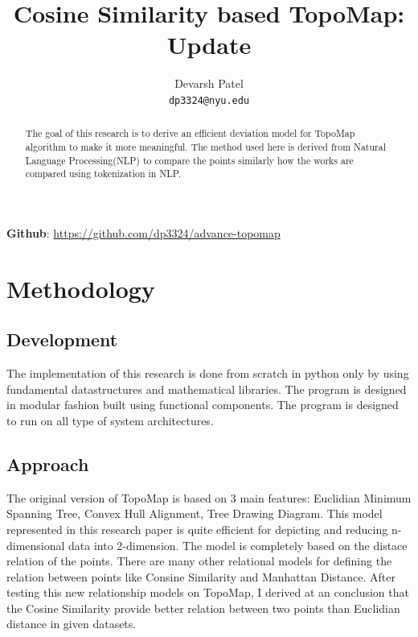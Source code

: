\documentclass[a4paper]{article}
\title{Cosine Similarity based TopoMap: Update}
\author{Devarsh Patel \\
  \texttt{dp3324@nyu.edu}}
\affil{
  Department of Computer Science \\
  NYU Tandon School of Technnology, NY
}
\begin{document}
  \maketitle

  \begin{center}
    \textbf{Github}: \href{https://github.com/dp3324/advance-topomap}{https://github.com/dp3324/advance-topomap}
  \end{center}

  \begin{abstract}
    The goal of this research is to derive an efficient deviation model for TopoMap algorithm to make it more meaningful. The method used here is derived from Natural Language Processing(NLP) to compare the points similarly how the works are compared using tokenization in NLP.
  \end{abstract}

  \section{Methodology}
  \subsection{Development}
    The implementation of this research is done from scratch in python only by using fundamental datastructures and mathematical libraries. The program is designed in modular fashion built using functional components. The program is designed to run on all type of system architectures. 


  \subsection{Approach}
    The original version of TopoMap\cite{topomap} is based on 3 main features: Euclidian Minimum Spanning Tree, Convex Hull Alignment, Tree Drawing Diagram. This model represented in this research paper is quite efficient for depicting and reducing n-dimensional data into 2-dimension. The model is completely based on the distace relation of the points. There are many other relational models for defining the relation between points like Consine Similarity and Manhattan Distance. After testing this new relationship models on TopoMap\cite{topomap}, I derived at an conclusion that the Cosine Similarity provide better relation between two points than Euclidian distance in given datasets. 
    
\end{document}

